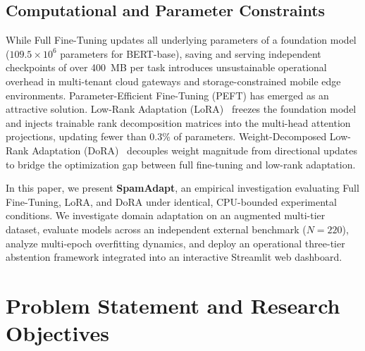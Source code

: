 \documentclass[conference]{IEEEtran}
\begin{document}
\subsection{Computational and Parameter Constraints}
While Full Fine-Tuning updates all underlying parameters of a foundation model ($109.5\times 10^6$ parameters for BERT-base), saving and serving independent checkpoints of over 400~MB per task introduces unsustainable operational overhead in multi-tenant cloud gateways and storage-constrained mobile edge environments. Parameter-Efficient Fine-Tuning (PEFT) has emerged as an attractive solution. Low-Rank Adaptation (LoRA)~\cite{hu2022lora} freezes the foundation model and injects trainable rank decomposition matrices into the multi-head attention projections, updating fewer than 0.3\% of parameters. Weight-Decomposed Low-Rank Adaptation (DoRA)~\cite{liu2024dora} decouples weight magnitude from directional updates to bridge the optimization gap between full fine-tuning and low-rank adaptation.

In this paper, we present \textbf{SpamAdapt}, an empirical investigation evaluating Full Fine-Tuning, LoRA, and DoRA under identical, CPU-bounded experimental conditions. We investigate domain adaptation on an augmented multi-tier dataset, evaluate models across an independent external benchmark ($N=220$), analyze multi-epoch overfitting dynamics, and deploy an operational three-tier abstention framework integrated into an interactive Streamlit web dashboard.

\section{Problem Statement and Research Objectives}
\label{sec:problem_objectives}
\end{document}
